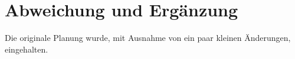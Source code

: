 \chapter{Abweichung und Ergänzung}\label{ch:abweichung-und-ergaenzung}
Die originale Planung wurde, mit Ausnahme von ein paar kleinen Änderungen, eingehalten.